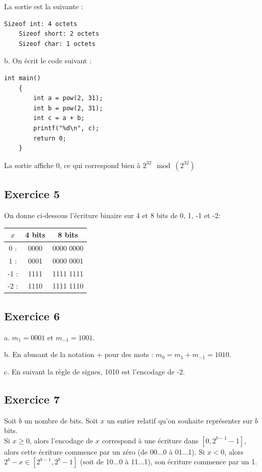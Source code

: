 \documentclass[11pt, a4 paper]{article}
\begin{document}
La sortie est la suivante :\\
\begin{lstlisting}[style=CStyle]
    Sizeof int: 4 octets
    Sizeof short: 2 octets
    Sizeof char: 1 octets
\end{lstlisting}

b. On écrit le code suivant :
\begin{lstlisting}[style=CStyle]
int main()
    {
        int a = pow(2, 31);
        int b = pow(2, 31);
        int c = a + b;
        printf("%d\n", c);
        return 0;
    }
\end{lstlisting}

La sortie affiche 0, ce qui correspond bien à $2^{32} \mod(2^{32})$

\subsection{Exercice 5}
On donne ci-dessous l'écriture binaire sur 4 et 8 bits de 0, 1, -1 et -2:
\begin{center}
    \begin{tabular}{c | c | c} 
    $x$ & 4 bits & 8 bits\\
        \hline
        \hline
    0 :& 0000 & 0000 0000\\ 
    1 :& 0001 & 0000 0001\\
    -1 :& 1111 & 1111 1111\\
    -2 :& 1110 & 1111 1110\\
     \hline
    \end{tabular}
\end{center}

\subsection{Exercice 6}
a. $m_1 = 0001$ et $m_{-1} = 1001$.

b. En abusant de la notation + pour des mots : $m_0 = m_1 + m_{-1} = 1010$.

c. En suivant la règle de signes, 1010 est l'encodage de -2.

\subsection{Exercice 7}
Soit $b$ un nombre de bits. Soit $x$ un entier relatif qu'on souhaite représenter sur $b$ bits.\\
Si $x \geq 0$, alors l'encodage de $x$ correspond à une écriture dans $[0, 2^{b-1}-1]$, alors cette écriture commence par un zéro (de 00...0 à 01...1). Si $x < 0$, alors $2^b - x \in [2^{b-1}, 2^b-1]$ (soit de 10...0 à 11...1), son écriture commence par un 1.
\end{document}
